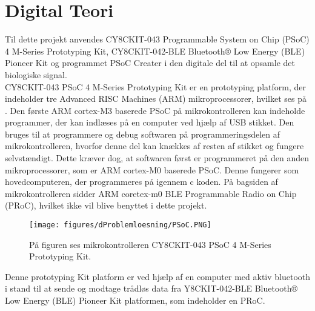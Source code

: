 \section{Digital Teori}
Til dette projekt anvendes CY8CKIT-043 Programmable System on Chip (PSoC) 4 M-Series Prototyping Kit, CY8CKIT-042-BLE Bluetooth® Low Energy (BLE) Pioneer Kit og programmet PSoC Creater i den digitale del til at opsamle det biologiske signal.\\
CY8CKIT-043 PSoC 4 M-Series Prototyping Kit er en prototyping platform, der indeholder tre Advanced RISC Machines (ARM) mikroprocessorer, hvilket ses på \figref. Den første ARM cortex-M3 baserede PSoC på mikrokontrolleren kan indeholde programmer, der kan indlæses på en computer ved hjælp af USB stikket. Den bruges til at programmere og debug softwaren på programmeringsdelen af mikrokontrolleren, hvorfor denne del kan knækkes af resten af stikket og fungere selvstændigt. Dette kræver dog, at softwaren først er programmeret på den anden mikroprocessorer, som er ARM cortex-M0 baserede PSoC. Denne fungerer som hovedcomputeren, der programmeres på igennem c koden. På bagsiden af mikrokontrolleren sidder ARM coretex-m0 BLE Programmable Radio on Chip (PRoC), hvilket ikke vil blive benyttet i dette projekt. \citep{CYPRESS2016PSoC,Semiconductor2016}
\begin{figure}[H]
	\centering
	\texttt{[image: figures/dProblemloesning/PSoC.PNG]}
	\caption{På figuren ses mikrokontrolleren CY8CKIT-043 PSoC 4 M-Series Prototyping Kit. \citep{CYPRESS2016PSoC}}
	\label{fig:PSoC}
\end{figure}
Denne prototyping Kit platform er ved hjælp af en computer med aktiv bluetooth i stand til at sende og modtage trådløs data fra Y8CKIT-042-BLE Bluetooth® Low Energy (BLE) Pioneer Kit platformen, som indeholder en PRoC.
